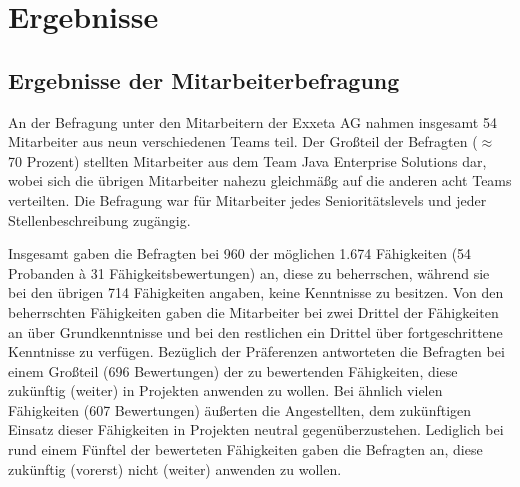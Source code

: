 
\chapter{Ergebnisse}
\label{ch:ergebnisse}

\section{Ergebnisse der Mitarbeiterbefragung}
An der Befragung unter den Mitarbeitern der Exxeta AG nahmen insgesamt 54 Mitarbeiter aus neun verschiedenen Teams teil.
Der Großteil der Befragten ($\approx$ 70 Prozent) stellten Mitarbeiter aus dem Team Java Enterprise Solutions dar, wobei sich die übrigen Mitarbeiter nahezu gleichmäßg auf die anderen acht Teams verteilten.
Die Befragung war für Mitarbeiter jedes Senioritätslevels und jeder Stellenbeschreibung zugängig.


Insgesamt gaben die Befragten bei 960 der möglichen 1.674 Fähigkeiten (54 Probanden \`{a} 31 Fähigkeitsbewertungen) an, diese zu beherrschen, während sie bei den übrigen 714 Fähigkeiten angaben, keine Kenntnisse zu besitzen.
Von den beherrschten Fähigkeiten gaben die Mitarbeiter bei zwei Drittel der Fähigkeiten an über Grundkenntnisse und bei den restlichen ein Drittel über fortgeschrittene Kenntnisse zu verfügen.
Bezüglich der Präferenzen antworteten die Befragten bei einem Großteil (696 Bewertungen) der zu bewertenden Fähigkeiten, diese zukünftig (weiter) in Projekten anwenden zu wollen.
Bei ähnlich vielen Fähigkeiten (607 Bewertungen) äußerten die Angestellten, dem zukünftigen Einsatz dieser Fähigkeiten in Projekten neutral gegenüberzustehen.
Lediglich bei rund einem Fünftel der bewerteten Fähigkeiten gaben die Befragten an, diese zukünftig (vorerst) nicht (weiter) anwenden zu wollen.

